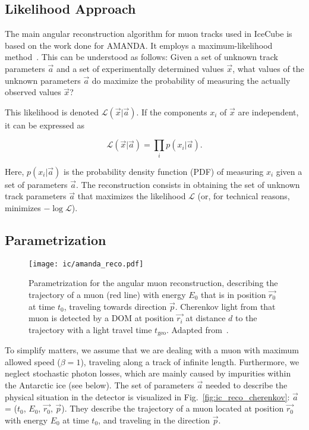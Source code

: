 \subsection{Likelihood Approach}
The main angular reconstruction algorithm for muon tracks used in IceCube is based on the work done for AMANDA. It employs a maximum-likelihood method~. This can be understood as follows: Given a set of unknown track parameters $\vec{a}$ and a set of experimentally determined values $\vec{x}$, what values of the unknown parameters $\vec{a}$ do maximize the probability of measuring the actually observed values $\vec{x}$?

This likelihood is denoted $\mathcal{L}(\vec{x}|\vec{a})$. If the components $x_i$ of $\vec{x}$ are independent, it can be expressed as

\begin{equation}
    \mathcal{L}(\vec{x}|\vec{a}) = \prod_i p(x_i|\vec{a}).
\end{equation}

Here, $p(x_i|\vec{a})$ is the probability density function (PDF) of measuring $x_i$ given a set of parameters $\vec{a}$. The reconstruction consists in obtaining the set of unknown track parameters $\vec{a}$ that maximizes the likelihood $\mathcal{L}$ (or, for technical reasons, minimizes $-\log{\mathcal{L}}$).

\subsection{Parametrization}
\begin{figure}[htb]
    \texttt{[image: ic/amanda\_reco.pdf]}
    \caption[Angular reconstruction in IceCube]{Parametrization for the angular muon reconstruction, describing the trajectory of a muon (red line) with energy $E_0$ that is in position $\vec{r_0}$ at time $t_0$, traveling towards direction $\vec{p}$. Cherenkov light from that muon is detected by a DOM at position $\vec{r_i}$ at distance $d$ to the trajectory with a light travel time $t_\text{geo}$. Adapted from~\cite{Ahrens2004}.}
\end{figure}

To simplify matters, we assume that we are dealing with a muon with maximum allowed speed ($\beta=1$), traveling along a track of infinite length. Furthermore, we neglect stochastic photon losses, which are mainly caused by impurities within the Antarctic ice (see below). The set of parameters $\vec{a}$ needed to describe the physical situation in the detector is visualized in Fig.~\ref{fig:ic_reco_cherenkov}: $\vec{a}$ = ($t_0$, $E_0$, $\vec{r_0}$, $\vec{p}$). They describe the trajectory of a muon located at position $\vec{r_0}$ with energy $E_0$ at time $t_0$, and traveling in the direction $\vec{p}$.

